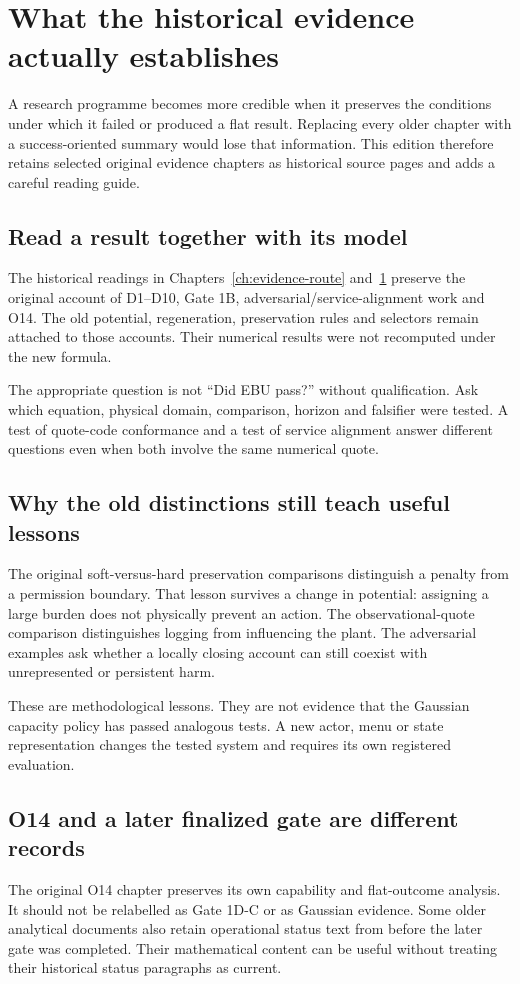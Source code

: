 \chapter{What the historical evidence actually establishes}\label{ch:evidence}
A research programme becomes more credible when it preserves the conditions
under which it failed or produced a flat result. Replacing every older
chapter with a success-oriented summary would lose that information. This
edition therefore retains selected original evidence chapters as historical
source pages and adds a careful reading guide.

\section{Read a result together with its model}
The historical readings in Chapters~\ref{ch:evidence-route} and~\ref{ch:evidence} preserve the original account of D1--D10,
Gate 1B, adversarial/service-alignment work and O14. The old potential,
regeneration, preservation rules and selectors remain attached to those
accounts. Their numerical results were not recomputed under the new formula.

The appropriate question is not ``Did EBU pass?'' without qualification.
Ask which equation, physical domain, comparison, horizon and falsifier were
tested. A test of quote-code conformance and a test of service alignment
answer different questions even when both involve the same numerical quote.

\section{Why the old distinctions still teach useful lessons}
The original soft-versus-hard preservation comparisons distinguish a penalty
from a permission boundary. That lesson survives a change in potential:
assigning a large burden does not physically prevent an action. The
observational-quote comparison distinguishes logging from influencing the
plant. The adversarial examples ask whether a locally closing account can
still coexist with unrepresented or persistent harm.

These are methodological lessons. They are not evidence that the Gaussian
capacity policy has passed analogous tests. A new actor, menu or state
representation changes the tested system and requires its own registered
evaluation.

\section{O14 and a later finalized gate are different records}
The original O14 chapter preserves its own capability and flat-outcome
analysis. It should not be relabelled as Gate 1D-C or as Gaussian evidence.
Some older analytical documents also retain operational status text from
before the later gate was completed. Their mathematical content can be
useful without treating their historical status paragraphs as current.

